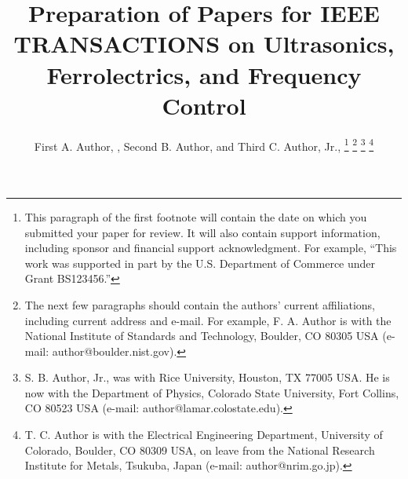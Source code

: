 \documentclass[journal,twoside,web]{ieeecolor}
\begin{document}
\title{Preparation of Papers for IEEE TRANSACTIONS on Ultrasonics, Ferrolectrics, and Frequency Control}
\author{First A. Author, , Second B. Author, and Third C. Author, Jr., 
\thanks{This paragraph of the first footnote will contain the date on 
which you submitted your paper for review. It will also contain support 
information, including sponsor and financial support acknowledgment. For 
example, ``This work was supported in part by the U.S. Department of 
Commerce under Grant BS123456.'' }
\thanks{The next few paragraphs should contain 
the authors' current affiliations, including current address and e-mail. For 
example, F. A. Author is with the National Institute of Standards and 
Technology, Boulder, CO 80305 USA (e-mail: author@boulder.nist.gov). }
\thanks{S. B. Author, Jr., was with Rice University, Houston, TX 77005 USA. He is 
now with the Department of Physics, Colorado State University, Fort Collins, 
CO 80523 USA (e-mail: author@lamar.colostate.edu).}
\thanks{T. C. Author is with 
the Electrical Engineering Department, University of Colorado, Boulder, CO 
80309 USA, on leave from the National Research Institute for Metals, 
Tsukuba, Japan (e-mail: author@nrim.go.jp).}}
\end{document}
